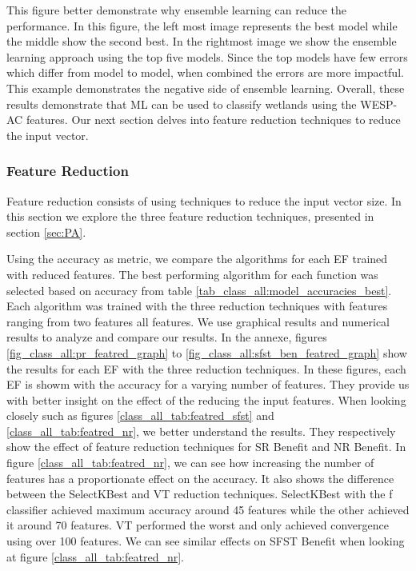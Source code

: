 \documentclass[12pt,letterpaper]{article}
\begin{document}
This figure better demonstrate why ensemble learning can reduce the performance.
In this figure, the left most image represents the best model while the middle show the second best.
In the rightmost image we show the ensemble learning approach using the top five models.
Since the top models have few errors which differ from model to model, when combined the errors are more impactful.
This example demonstrates the negative side of ensemble learning.
Overall, these results demonstrate that \ac{ML} can be used to classify wetlands using the WESP-AC features.
Our next section delves into feature reduction techniques to reduce the input vector.


\subsubsection{Feature Reduction}\label{sec:class_all_featred}
Feature reduction consists of using techniques to reduce the input vector size.
In this section we explore the three feature reduction techniques, presented in section \ref{sec:PA}.

Using the accuracy as metric, we compare the algorithms for each \ac{EF} trained with reduced features.
The best performing algorithm for each function was selected based on accuracy from table \ref{tab_class_all:model_accuracies_best}.
Each algorithm was trained with the three reduction techniques with features ranging from two features all features.
We use graphical results and numerical results to analyze and compare our results.
In the annexe, figures \ref{fig_class_all:pr_featred_graph} to \ref{fig_class_all:sfst_ben_featred_graph} show the results for each \ac{EF} with the three reduction techniques.
In these figures, each \ac{EF} is showm with the accuracy for a varying number of features.
They provide us with better insight on the effect of the reducing the input features.
When looking closely such as figures \ref{class_all_tab:featred_sfst} and \ref{class_all_tab:featred_nr}, we better understand the results.
They respectively show the effect of feature reduction techniques for \ac{SR} Benefit and \ac{NR} Benefit.
In figure \ref{class_all_tab:featred_nr}, we can see how increasing the number of features has a proportionate effect on the accuracy.
It also shows the difference between the SelectKBest and \ac{VT} reduction techniques.
SelectKBest with the f classifier achieved maximum accuracy around 45 features while the other achieved it around 70 features.
\ac{VT} performed the worst and only achieved convergence using over 100 features.
We can see similar effects on \ac{SFST} Benefit when looking at figure \ref{class_all_tab:featred_nr}.
\end{document}
